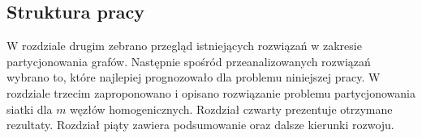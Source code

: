 \subsection{Struktura pracy}

W rozdziale drugim zebrano przegląd istniejących rozwiązań w zakresie partycjonowania grafów.
Następnie spośród przeanalizowanych rozwiązań wybrano to, które najlepiej prognozowało dla
problemu niniejszej pracy.
W rozdziale trzecim zaproponowano i opisano rozwiązanie problemu partycjonowania siatki dla
$m$ węzłów homogenicznych.
Rozdział czwarty prezentuje otrzymane rezultaty.
Rozdział piąty zawiera podsumowanie oraz dalsze kierunki rozwoju.